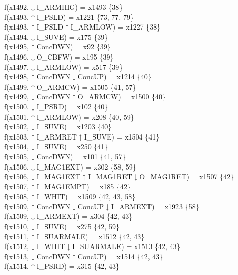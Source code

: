 f(x1492,$\downarrow$I\_ARMHIG) = x1493 \{38\} \\  
f(x1493,$\uparrow$I\_PSLD) = x1221 \{73, 77, 79\} \\  
f(x1493,$\uparrow$I\_PSLD$\uparrow$I\_ARMLOW) = x1227 \{38\} \\  
f(x1494,$\downarrow$I\_SUVE) = x175 \{39\} \\  
f(x1495,$\uparrow$ConcDWN) = x92 \{39\} \\  
f(x1496,$\downarrow$O\_CBFW) = x195 \{39\} \\  
f(x1497,$\downarrow$I\_ARMLOW) = x517 \{39\} \\  
f(x1498,$\uparrow$ConcDWN$\downarrow$ConcUP) = x1214 \{40\} \\  
f(x1499,$\uparrow$O\_ARMCW) = x1505 \{41, 57\} \\  
f(x1499,$\downarrow$ConcDWN$\uparrow$O\_ARMCW) = x1500 \{40\} \\  
f(x1500,$\downarrow$I\_PSRD) = x102 \{40\} \\  
f(x1501,$\uparrow$I\_ARMLOW) = x208 \{40, 59\} \\  
f(x1502,$\downarrow$I\_SUVE) = x1203 \{40\} \\  
f(x1503,$\uparrow$I\_ARMRET$\uparrow$I\_SUVE) = x1504 \{41\} \\  
f(x1504,$\downarrow$I\_SUVE) = x250 \{41\} \\  
f(x1505,$\downarrow$ConcDWN) = x101 \{41, 57\} \\  
f(x1506,$\downarrow$I\_MAG1EXT) = x302 \{58, 59\} \\  
f(x1506,$\downarrow$I\_MAG1EXT$\uparrow$I\_MAG1RET$\downarrow$O\_MAG1RET) = x1507 \{42\} \\  
f(x1507,$\uparrow$I\_MAG1EMPT) = x185 \{42\} \\  
f(x1508,$\uparrow$I\_WHIT) = x1509 \{42, 43, 58\} \\  
f(x1509,$\uparrow$ConcDWN$\downarrow$ConcUP$\downarrow$I\_ARMEXT) = x1923 \{58\} \\  
f(x1509,$\downarrow$I\_ARMEXT) = x304 \{42, 43\} \\  
f(x1510,$\downarrow$I\_SUVE) = x275 \{42, 59\} \\  
f(x1511,$\uparrow$I\_SUARMALE) = x1512 \{42, 43\} \\  
f(x1512,$\downarrow$I\_WHIT$\downarrow$I\_SUARMALE) = x1513 \{42, 43\} \\  
f(x1513,$\downarrow$ConcDWN$\uparrow$ConcUP) = x1514 \{42, 43\} \\  
f(x1514,$\uparrow$I\_PSRD) = x315 \{42, 43\} \\  
